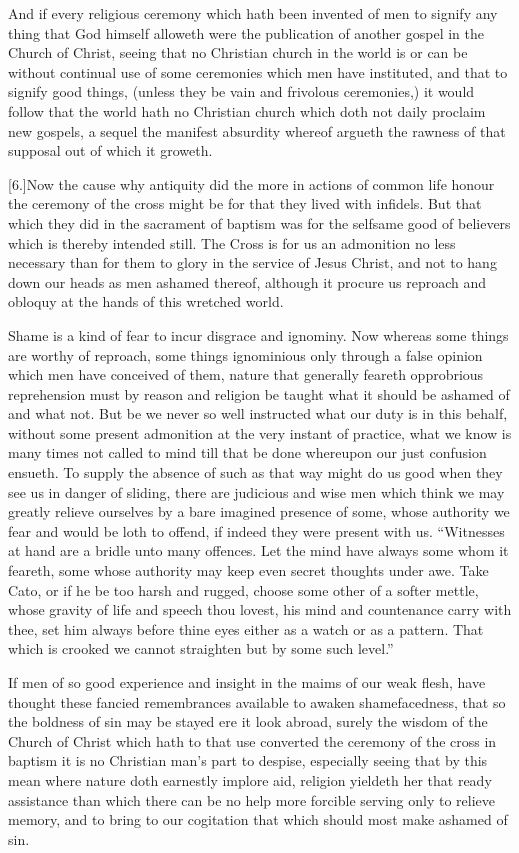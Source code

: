 And if every religious ceremony which hath been invented of men to signify any thing that God himself alloweth were the publication of another gospel in the Church of Christ, seeing that no Christian church in the world is or can be without continual use of some ceremonies which men have instituted, and that to signify good things, (unless they be vain and frivolous ceremonies,) it would follow that the world hath no Christian church which doth not daily proclaim new gospels, a sequel the manifest absurdity whereof argueth the rawness of that supposal out of which it groweth.

[6.]Now the cause why antiquity did the more in actions  of common life honour the ceremony of the cross might be for that they lived with infidels. But that which they did in the sacrament of baptism was for the selfsame good of believers which is thereby intended still. The Cross is for us an admonition no less necessary than for them to glory in the service of Jesus Christ, and not to hang down our heads as men ashamed thereof, although it procure us reproach and obloquy at the hands of this wretched world.

Shame is a kind of fear to incur disgrace and ignominy. Now whereas some things are worthy of reproach, some things ignominious only through a false opinion which men have conceived of them, nature that generally feareth opprobrious reprehension must by reason and religion be taught what it should be ashamed of and what not. But be we never so well instructed what our duty is in this behalf, without some present admonition at the very instant of practice, what we know is many times not called to mind till that be done whereupon our just confusion ensueth. To supply the absence of such as that way might do us good when they see us in danger of sliding, there are judicious and wise men which think we may greatly relieve ourselves by a bare imagined presence of some, whose authority we fear and would be loth  to offend, if indeed they were present with us.
 “Witnesses at hand are a bridle unto many offences. Let the mind have always some whom it feareth, some whose authority may keep even secret thoughts under awe. Take Cato, or if he be too harsh and rugged, choose some other of a softer mettle, whose gravity of life and speech thou lovest, his mind and countenance carry with thee, set him always before thine eyes either as a watch or as a pattern. That which is crooked we cannot straighten but by some such level.”

If men of so good experience and insight in the maims of our weak flesh, have thought these fancied remembrances available to awaken shamefacedness, that so the boldness of sin may be stayed ere it look abroad, surely the wisdom of the Church of Christ which hath to that use converted the ceremony of the cross in baptism it is no Christian man’s part to despise, especially seeing that by this mean where nature doth earnestly implore aid, religion yieldeth her that ready assistance than which there can be no help more forcible serving only to relieve memory, and to bring to our cogitation that which should most make ashamed of sin.

